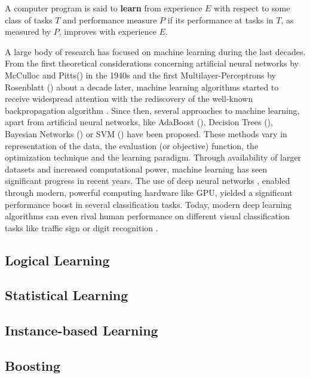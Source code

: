 \begin{defn}
A computer program is said to \textbf{learn} from experience $E$ with respect to some class of tasks $T$ and performance measure $P$ if its performance at tasks in $T$, as measured by $P$, improves with experience $E$.
\end{defn}
A large body of research has focused on machine learning during the last decades.
From the first theoretical considerations concerning artificial neural networks by McCulloc and Pitts() in the 1940s and the first Multilayer-Perceptrons by Rosenblatt () about a decade later, machine learning algorithms started to receive widespread attention with the rediscovery \cite{Rumelhart1988} of the well-known backpropagation algorithm \cite{Werbos1974}.
Since then, several approaches to machine learning, apart from artificial neural networks, like AdaBoost (), Decision Trees (), Bayesian Networks () or \ac{SVM} () have been proposed.
These methods vary in representation of the data, the evaluation (or objective) function, the optimization technique and the learning paradigm.
Through availability of larger datasets and increased computational power, machine learning has seen significant progress in recent years.
The use of deep neural networks \cite{Schmidhuber2015}, enabled through modern, powerful computing hardware like \ac{GPU}, yielded a significant performance boost in several classification tasks. 
Today, modern deep learning algorithms can even rival human performance on different visual classification tasks like traffic sign \cite{Ciresan2012} or digit recognition \cite{Ciresan2012a}.
\subsection{Logical Learning}
\subsection{Statistical Learning}
\subsection{Instance-based Learning}
\subsection{Boosting}
